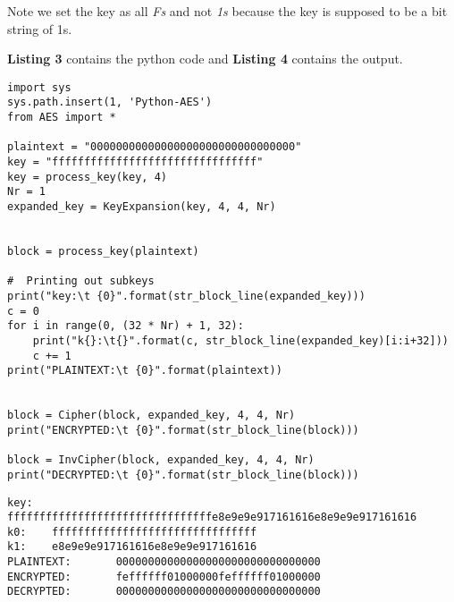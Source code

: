 \documentclass[10pt,a4paper,oneside]{article}
\begin{document}
Note we set the key as all \textit{Fs} and not \textit{1s} because the key is supposed to be a bit string of 1s.

\textbf{Listing 3} contains the python code and \textbf{Listing 4} contains the output.

\lstset{showstringspaces=false}
\begin{lstlisting}
import sys
sys.path.insert(1, 'Python-AES')
from AES import *

plaintext = "00000000000000000000000000000000"
key = "ffffffffffffffffffffffffffffffff"
key = process_key(key, 4)
Nr = 1
expanded_key = KeyExpansion(key, 4, 4, Nr)


block = process_key(plaintext)

#  Printing out subkeys
print("key:\t {0}".format(str_block_line(expanded_key)))
c = 0
for i in range(0, (32 * Nr) + 1, 32):
    print("k{}:\t{}".format(c, str_block_line(expanded_key)[i:i+32]))
    c += 1
print("PLAINTEXT:\t {0}".format(plaintext))


block = Cipher(block, expanded_key, 4, 4, Nr)
print("ENCRYPTED:\t {0}".format(str_block_line(block)))

block = InvCipher(block, expanded_key, 4, 4, Nr)
print("DECRYPTED:\t {0}".format(str_block_line(block)))
\end{lstlisting}

\begin{lstlisting}
key:   ffffffffffffffffffffffffffffffffe8e9e9e917161616e8e9e9e917161616
k0:    ffffffffffffffffffffffffffffffff
k1:    e8e9e9e917161616e8e9e9e917161616
PLAINTEXT:       00000000000000000000000000000000
ENCRYPTED:       feffffff01000000feffffff01000000
DECRYPTED:       00000000000000000000000000000000
\end{lstlisting}
\end{document}
